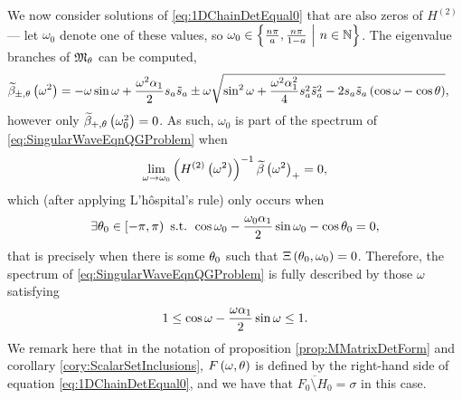 We now consider solutions of \eqref{eq:1DChainDetEqual0} that are also zeros of $H^{(2)}$ --- let $\omega_0$ denote one of these values, so $\omega_0\in\left\{ \frac{n\pi}{a}, \frac{n\pi}{1-a} \ \middle\vert \  n\in\mathbb{N}  \right\}$.
The eigenvalue branches of $\mathfrak{M}_{\theta}$ can be computed,
\begin{align*}
	\widetilde{\beta}_{\pm, \theta}\left( \omega^2 \right) &= -\omega\sin\omega + \frac{\omega^2\alpha_1}{2}s_a \tilde{s}_a \pm \omega\sqrt{ \sin^2\omega + \frac{\omega^2\alpha_1^2}{4}s_a^2 \tilde{s}_a^2 - 2s_a \tilde{s}_a\left( \cos\omega-\cos\theta \right) },
\end{align*}
however only $\widetilde{\beta}_{+, \theta}\left( \omega_0^2 \right)=0$.
As such, $\omega_0$ is part of the spectrum of \eqref{eq:SingularWaveEqnQGProblem} when
\begin{align*}
	\lim_{\omega\rightarrow\omega_0}\left(  H^{(2)}\left( \omega^2 \right)  \right)^{-1}\widetilde{\beta}\left( \omega^2 \right)_{+} = 0,
\end{align*}
which (after applying L'h\^{o}spital's rule) only occurs when
\begin{align*}
	\exists\theta_0\in\left[-\pi,\pi\right) \text{ s.t. } \cos\omega_0 - \frac{\omega_0\alpha_1}{2}\sin\omega_0 - \cos\theta_0 = 0,
\end{align*}
that is precisely when there is some $\theta_0$ such that $\Xi\left( \theta_0,\omega_0 \right)=0$.
Therefore, the spectrum of \eqref{eq:SingularWaveEqnQGProblem} is fully described by those $\omega$ satisfying
\begin{align*}
	\-1 \leq \cos\omega - \frac{\omega\alpha_1}{2}\sin\omega \leq 1.
\end{align*}
We remark here that in the notation of proposition \ref{prop:MMatrixDetForm} and corollary \ref{cory:ScalarSetInclusions}, $F\left( \omega, \theta \right)$ is defined by the right-hand side of equation \eqref{eq:1DChainDetEqual0}, and we have that $\overline{F_0\setminus H_0}=\sigma$ in this case.


